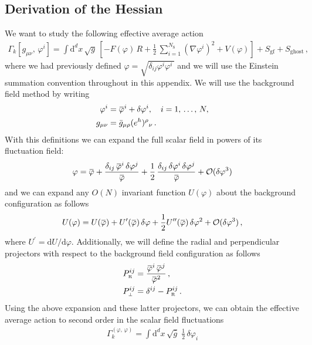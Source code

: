 \documentclass[11pt]{book}
\newcommand{\overbar}[1]{\mkern 1.5mu\overline{\mkern-1.5mu#1\mkern-1.5mu}\mkern 1.5mu}
\newcommand\gmunu{ g_{\mu\nu} }
\newcommand\NS{ N_{\scriptscriptstyle{\mathrm{S}}} }
\newcommand{\bp}{\overbar \varphi}
\newcommand{\deltap}{\delta \varphi}
\newcommand{\projR}{ P_{\scriptscriptstyle\mathrm R}^{ij} }
\newcommand{\projperp}{ P_{\scriptscriptstyle \perp}^{ij} }
\numberwithin{equation}{chapter}
\begin{document}
\begin{appendices}
\section{Derivation of the Hessian}
We want to study the following effective average action
\begin{align}
  \Gamma_k [\gmunu, \, \varphi^i] =
  \int \mathrm d^dx \, \sqrt{g} \,
  \left[ - F(\varphi) \, R + \frac{1}{2} \, \sum_{i=1}^{\NS} \left( \nabla\varphi^i \right)^2 + V(\varphi)  \right]
  + S_{\mathrm{gf}} + S_{\mathrm{ghost}} \,,
\end{align}
where we had previously defined $\varphi=\sqrt{\delta_{ij} \varphi^i \varphi^i \,}$
and we will use the Einstein summation convention throughout in this appendix.
We will use the background field method by writing
\begin{align}
\varphi^i &= \bp^i + \deltap^i,\quad i = 1,\, \dots,\, N, \\
g_{\mu\nu} &= \bar{g}_{\mu\rho} (e^h)^\rho{}_\nu \,.
\end{align}
With this definitions we can expand the full scalar field in powers
of its fluctuation field:
\begin{align}
  \varphi = \bp
  + \frac{ \delta_{ij} \, \bp^i  \,\deltap^j}{\bp}
  + \frac{1}{2} \, \frac{ \delta_{ij} \, \deltap^i  \,\deltap^j}{\bp}
  + \mathcal O (\deltap ^3)
\end{align}
and we can expand any $O(N)$ invariant function $U(\varphi)$ about the background configuration as follows
\begin{align}
  U(\varphi) = U(\bp)
  + U^{\prime}(\bp) \, \deltap
  + \frac{1}{2} U^{\prime\prime}(\bp) \, \deltap^2
  + \mathcal{O}(\deltap^3)\,,
\end{align}
where $U^{\prime} = \mathrm{d} U/\mathrm{d} \varphi$.
Additionally, we will define the radial and perpendicular projectors with respect
to the background field configuration as follows
\begin{align}
  \projR
  &= \frac{\bp^i \, \bp^j}{\bp^2} \,, \\
  \projperp
  &= \delta^{ij} - P_{\scriptscriptstyle\mathrm R}^{ij} \,.
\end{align}
Using the above expansion and these latter projectors,
we can obtain the effective average action to second order
in the scalar field fluctuations
\begin{align}
  \Gamma_k^{(\varphi,\, \varphi)} =
  \int \mathrm d^d x \, \sqrt{\bar{g}} \; \frac{1}{2} \, \deltap_i

\end{align}
\end{appendices}
\end{document}
